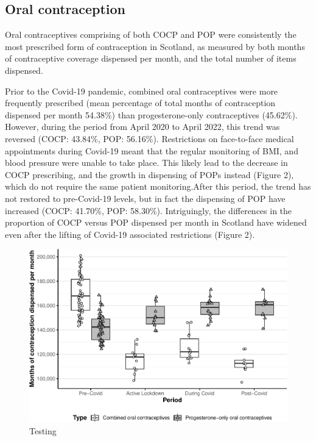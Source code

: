 \documentclass[
]{article}
\begin{document}
\hypertarget{oral-contraception}{%
\subsection{Oral contraception}\label{oral-contraception}}

Oral contraceptives comprising of both COCP and POP were consistently
the most prescribed form of contraception in Scotland, as measured by
both months of contraceptive coverage dispensed per month, and the total
number of items dispensed.

Prior to the Covid-19 pandemic, combined oral contraceptives were more
frequently prescribed (mean percentage of total months of contraception
dispensed per month 54.38\%) than progesterone-only contraceptives
(45.62\%). However, during the period from April 2020 to April 2022,
this trend was reversed (COCP: 43.84\%, POP: 56.16\%). Restrictions on
face-to-face medical appointments during Covid-19 meant that the regular
monitoring of BMI, and blood pressure were unable to take place. This
likely lead to the decrease in COCP prescribing, and the growth in
dispensing of POPs instead (Figure 2), which do not require the same
patient monitoring.After this period, the trend has not restored to
pre-Covid-19 levels, but in fact the dispensing of POP have increased
(COCP: 41.70\%, POP: 58.30\%). Intriguingly, the differences in the
proportion of COCP versus POP dispensed per month in Scotland have
widened even after the lifting of Covid-19 associated restrictions
(Figure 2).

\begin{figure}
\centering
\includegraphics{Manuscript_files/figure-latex/Figure2-1.pdf}
\caption{Testing}
\end{figure}
\end{document}
